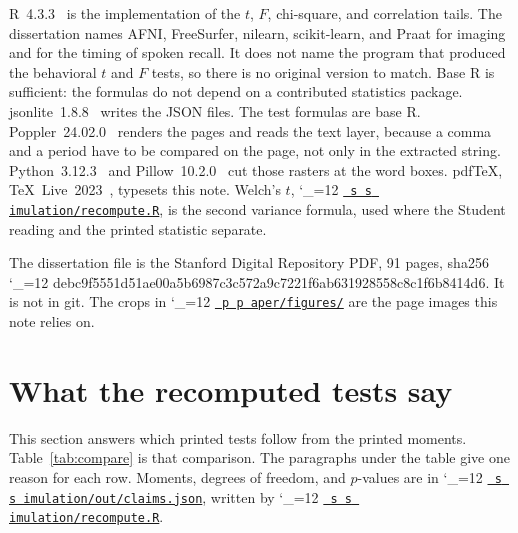 \documentclass[11pt]{article}
\makeatletter
\newcommand{\sha}{\begingroup\catcode`\_=12 \sha@read}
\newcommand{\sha@read}[1]{\ttfamily\sha@loop#1\relax\endgroup}
\def\sha@loop#1{%
  \ifx\relax#1\else
    #1\allowbreak
    \expandafter\sha@loop
  \fi}
\def\ogm@show#1{%
  \ifx\relax#1\else
    #1\allowbreak
    \expandafter\ogm@show
  \fi}
\newcommand{\src}{\begingroup\catcode`\_=12 \ogm@src}
\newcommand{\ogm@src}[1]{%
  \edef\srcurl{https://github.com/alectionary/vibe-math/blob/master/formalization/overgeneral-memory/#1}%
  \href{\srcurl}{\texttt{\ogm@show#1\relax}}\endgroup}
\newcommand{\srcat}{\begingroup\catcode`\_=12 \ogm@srcat}
\newcommand{\ogm@srcat}[2]{%
  \edef\srcurl{https://github.com/alectionary/vibe-math/blob/master/formalization/overgeneral-memory/#1\#L#2}%
  \href{\srcurl}{\texttt{\ogm@show#1\relax}}\endgroup}
\makeatother
\begin{document}
R~4.3.3~\cite{rcore} is the implementation of the \(t\), \(F\), chi-square,
and correlation tails.
The dissertation names AFNI, FreeSurfer, nilearn, scikit-learn, and Praat
for imaging and for the timing of spoken recall.
It does not name the program that produced the behavioral \(t\) and \(F\)
tests, so there is no original version to match.
Base R is sufficient: the formulas do not depend on a contributed statistics
package.
jsonlite~1.8.8~\cite{jsonlite} writes the JSON files.
The test formulas are base R.
Poppler~24.02.0~\cite{poppler} renders the pages and reads the text layer,
because a comma and a period have to be compared on the page, not only in
the extracted string.
Python~3.12.3~\cite{python} and Pillow~10.2.0~\cite{pillow} cut those
rasters at the word boxes.
pdf\TeX, \TeX~Live~2023~\cite{texlive}, typesets this note.
Welch's \(t\), \srcat{simulation/recompute.R}{50}, is the second variance
formula, used where the Student reading and the printed statistic separate.

The dissertation file is the Stanford Digital Repository PDF, 91 pages,
sha256
\sha{4debc9f5551d51ae00a5b6987c3c572a9c7221f6ab631928558c8c1f6b8414d6}.
It is not in git.
The crops in \src{paper/figures/} are the page images this note relies on.

\section{What the recomputed tests say}
\label{sec:table}

This section answers which printed tests follow from the printed moments.
Table~\ref{tab:compare} is that comparison.
The paragraphs under the table give one reason for each row.
Moments, degrees of freedom, and \(p\)-values are in
\src{simulation/out/claims.json}, written by
\srcat{simulation/recompute.R}{37}.
\end{document}
